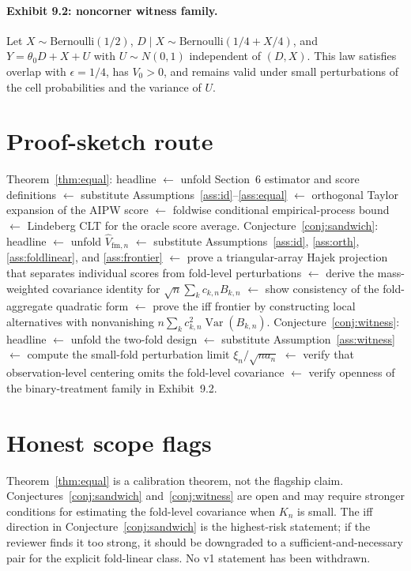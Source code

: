 \documentclass[11pt]{article}
\theoremstyle{definition}
\theoremstyle{plain}
\theoremstyle{remark}
\begin{document}
\paragraph{Exhibit 9.2: noncorner witness family.}
Let \(X\sim\mathrm{Bernoulli}(1/2)\), \(D\mid X\sim\mathrm{Bernoulli}(1/4+X/4)\), and \(Y=\theta_0D+X+U\) with \(U\sim N(0,1)\) independent of \((D,X)\). This law satisfies overlap with \(\epsilon=1/4\), has \(V_0>0\), and remains valid under small perturbations of the cell probabilities and the variance of \(U\).

\section{Proof-sketch route}
Theorem~\ref{thm:equal}: headline \(\leftarrow\) unfold Section~6 estimator and score definitions \(\leftarrow\) substitute Assumptions~\ref{ass:id}--\ref{ass:equal} \(\leftarrow\) orthogonal Taylor expansion of the AIPW score \(\leftarrow\) foldwise conditional empirical-process bound \(\leftarrow\) Lindeberg CLT for the oracle score average. Conjecture~\ref{conj:sandwich}: headline \(\leftarrow\) unfold \(\hat V_{\mathrm{fm},n}\) \(\leftarrow\) substitute Assumptions~\ref{ass:id}, \ref{ass:orth}, \ref{ass:foldlinear}, and \ref{ass:frontier} \(\leftarrow\) prove a triangular-array Hajek projection that separates individual scores from fold-level perturbations \(\leftarrow\) derive the mass-weighted covariance identity for \(\sqrt n\sum_k c_{k,n}B_{k,n}\) \(\leftarrow\) show consistency of the fold-aggregate quadratic form \(\leftarrow\) prove the iff frontier by constructing local alternatives with nonvanishing \(n\sum_k c_{k,n}^2\operatorname{Var}(B_{k,n})\). Conjecture~\ref{conj:witness}: headline \(\leftarrow\) unfold the two-fold design \(\leftarrow\) substitute Assumption~\ref{ass:witness} \(\leftarrow\) compute the small-fold perturbation limit \(\xi_n/\sqrt{n a_n}\) \(\leftarrow\) verify that observation-level centering omits the fold-level covariance \(\leftarrow\) verify openness of the binary-treatment family in Exhibit~9.2.

\section{Honest scope flags}
Theorem~\ref{thm:equal} is a calibration theorem, not the flagship claim. Conjectures~\ref{conj:sandwich} and~\ref{conj:witness} are open and may require stronger conditions for estimating the fold-level covariance when \(K_n\) is small. The iff direction in Conjecture~\ref{conj:sandwich} is the highest-risk statement; if the reviewer finds it too strong, it should be downgraded to a sufficient-and-necessary pair for the explicit fold-linear class. No v1 statement has been withdrawn.
\end{document}
